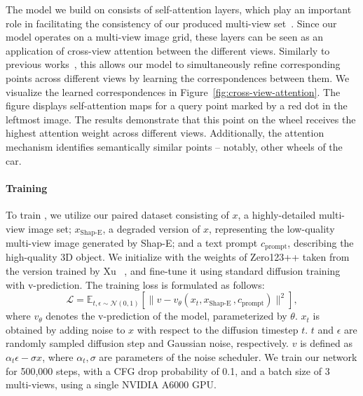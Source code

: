 The model we build on consists of self-attention layers, which play an important role in facilitating the consistency of our produced multi-view set~\cite{shi2024mvdream, wang2023imagedream}. Since our model operates on a multi-view image grid, these layers can be seen as an application of cross-view attention between the different views. Similarly to previous works~\cite{wang2023imagedream, shi2024mvdream, shi2023zero123singleimageconsistent}, this allows our model to simultaneously refine corresponding points across different views by learning the correspondences between them. 
We visualize the learned correspondences in Figure~\ref{fig:cross-view-attention}. The figure displays self-attention maps for a query point marked by a red dot in the leftmost image. The results demonstrate that this point on the wheel receives the highest attention weight across different views. Additionally, the attention mechanism identifies semantically similar points -- notably, other wheels of the car.

\vspace{-14pt}
\paragraph{Training}



To train \ourname, we utilize our paired dataset consisting of $x$, a highly-detailed multi-view image set; $x_{\text{Shap-E}}$, a degraded version of $x$, representing the low-quality multi-view image generated by Shap-E; and a text prompt $c_{\text{prompt}}$, describing the high-quality 3D object.
We initialize \ourname{} with the weights of Zero123++ taken from the version trained by Xu \etal~\cite{instant3d2023}, and fine-tune it using standard diffusion training with v-prediction. The training loss is formulated as follows:
\[
\mathcal{L} = \mathbb{E}_{t, \epsilon \sim \mathcal{N}(0,1)} \left[ \| v - v_\theta(x_t, x_{\text{Shap-E}} \, ,c_{\text{prompt}}) \|^2 \right],
\]
where $v_\theta$ denotes the v-prediction of the model, parameterized by $\theta$. $x_t$ is obtained by adding noise to $x$ with respect to the diffusion timestep $t$. $t$ and $\epsilon$ are randomly sampled diffusion step and Gaussian noise, respectively. $v$ is defined as $\alpha_t\epsilon - \sigma x$, where $\alpha_t, \sigma$ are parameters of the noise scheduler.
We train our network for 500,000 steps, with a CFG drop probability of 0.1, and a batch size of 3 multi-views, using a single NVIDIA A6000 GPU. 

